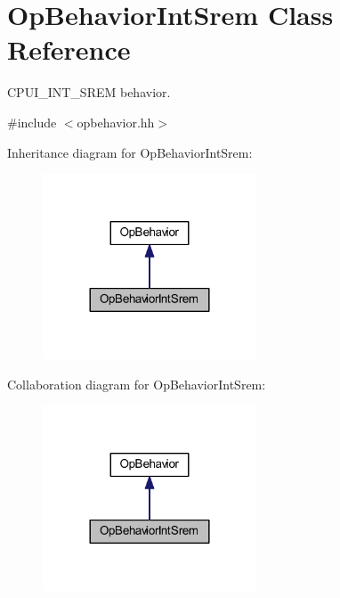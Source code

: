 \hypertarget{class_op_behavior_int_srem}{}\section{Op\+Behavior\+Int\+Srem Class Reference}
\label{class_op_behavior_int_srem}


C\+P\+U\+I\+\_\+\+I\+N\+T\+\_\+\+S\+R\+EM behavior.  




{\ttfamily \#include $<$opbehavior.\+hh$>$}



Inheritance diagram for Op\+Behavior\+Int\+Srem\+:
\nopagebreak
\begin{figure}[H]
\begin{center}
\leavevmode
\includegraphics[width=180pt]{class_op_behavior_int_srem__inherit__graph}
\end{center}
\end{figure}


Collaboration diagram for Op\+Behavior\+Int\+Srem\+:
\nopagebreak
\begin{figure}[H]
\begin{center}
\leavevmode
\includegraphics[width=180pt]{class_op_behavior_int_srem__coll__graph}
\end{center}
\end{figure}
